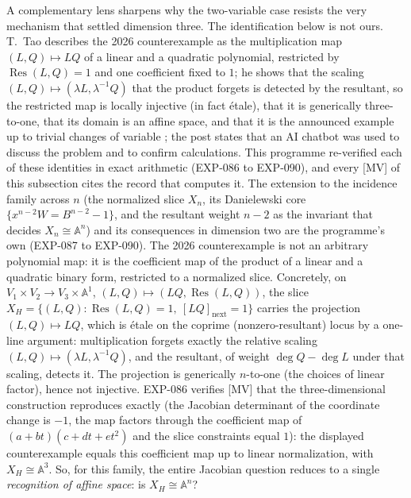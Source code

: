 \documentclass[11pt]{article}
\theoremstyle{remark}
\begin{document}
A complementary lens sharpens why the two-variable case resists the very mechanism
that settled dimension three. The identification below is not ours. T.~Tao describes the 2026 counterexample as the multiplication map $(L,Q)\mapsto LQ$ of a
linear and a quadratic polynomial, restricted by $\operatorname{Res}(L,Q)=1$ and one coefficient fixed to $1$; he shows that the
scaling $(L,Q)\mapsto(\lambda L,\lambda^{-1}Q)$ that the product forgets is detected by the resultant, so the restricted map is
locally injective (in fact \'etale), that it is generically three-to-one, that its domain is an affine space, and that it is the
announced example up to trivial changes of variable \cite{Tao2026}; the post states that an AI chatbot was used to discuss the
problem and to confirm calculations. This programme re-verified each of these identities in exact arithmetic (EXP-086 to
EXP-090), and every [MV] of this subsection cites the record that computes it. The extension to the incidence family across
$n$ (the normalized slice $X_n$, its Danielewski core $\{x^{n-2}W=B^{n-2}-1\}$, and the resultant weight $n-2$ as the invariant
that decides $X_n\cong\mathbb A^n$) and its consequences in dimension two are the programme's own (EXP-087 to EXP-090). The 2026 counterexample is not an arbitrary polynomial
map: it is the coefficient map of the product of a linear and a quadratic binary
form, restricted to a normalized slice. Concretely, on
$V_1\times V_2\to V_3\times\mathbb{A}^1$, $(L,Q)\mapsto(LQ,\operatorname{Res}(L,Q))$,
the slice $X_H=\{(L,Q):\operatorname{Res}(L,Q)=1,\ [LQ]_{\text{next}}=1\}$ carries the
projection $(L,Q)\mapsto LQ$, which is \'etale on the coprime (nonzero-resultant) locus
by a one-line argument: multiplication forgets exactly the relative scaling
$(L,Q)\mapsto(\lambda L,\lambda^{-1}Q)$, and the resultant, of weight $\deg Q-\deg L$
under that scaling, detects it. The projection is generically $n$-to-one (the choices
of linear factor), hence not injective. EXP-086 verifies [MV] that the three-dimensional construction
reproduces exactly (the Jacobian determinant of the coordinate change is $-1$, the map factors through the coefficient map of
$(a+bt)(c+dt+et^2)$ and the slice constraints equal $1$): the
displayed counterexample equals this coefficient map up to linear normalization, with
$X_H\cong\mathbb{A}^3$. So, for this family, the entire Jacobian question reduces to a
single \emph{recognition of affine space}: is $X_H\cong\mathbb{A}^n$?
\end{document}
